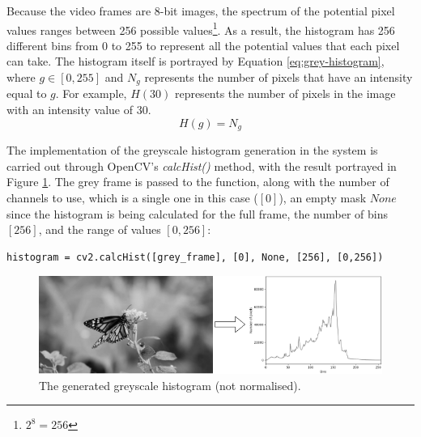 Because the video frames are 8-bit images, the spectrum of the potential pixel values ranges between 256 possible values\footnote{$2^8=256$}. As a result, the histogram has 256 different bins from 0 to 255 to represent all the potential values that each pixel can take. The histogram itself is portrayed by Equation \ref{eq:grey-histogram}, where $g\in [0, 255]$ and $N_g$ represents the number of pixels that have an intensity equal to $g$. For example, $H(30)$ represents the number of pixels in the image with an intensity value of 30.
\begin{equation}
\label{eq:grey-histogram}
    H(g)=N_g
\end{equation}

The implementation of the greyscale histogram generation in the system is carried out through OpenCV's \textit{calcHist()} method, with the result portrayed in Figure \ref{fig:implementation-greyscale_not_normalised}. The grey frame is passed to the function, along with the number of channels to use, which is a single one in this case ($[0]$), an empty mask $None$ since the histogram is being calculated for the full frame, the number of bins $[256]$, and the range of values $[0, 256]$:

\begin{lstlisting}[caption=Python example]
histogram = cv2.calcHist([grey_frame], [0], None, [256], [0,256])
\end{lstlisting}

\begin{figure}[h] 
\centerline{\includegraphics[width=\textwidth]{figures/implementation/greyscale_not_normalised.png}}
\caption{\label{fig:implementation-greyscale_not_normalised}The generated greyscale histogram (not normalised).}
\end{figure}

